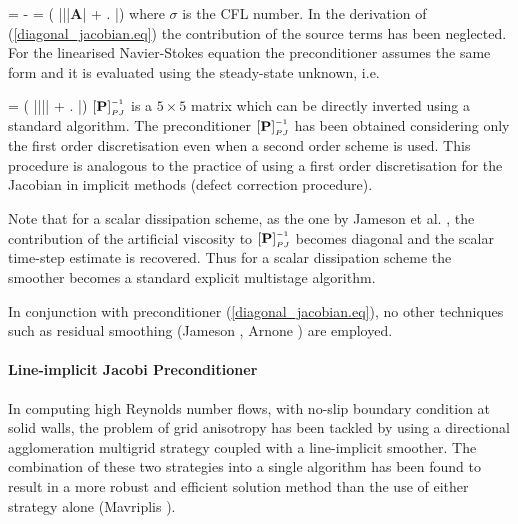 %
\beq
  \left[{\bf P}\right] =
  - 
  = 
   \sum{}
   \left( \left|\vec{\eta}\right|\left|{\bf A}\right|
   + \tau{} \left.
                {}\right|\sm{\mu}\right)
 \label{diagonal_jacobian.eq}
\eeq
%
 where $\sigma$ is the CFL number. In the derivation of (\ref{diagonal_jacobian.eq})
 the contribution of the source terms has been neglected.
 For the linearised Navier-Stokes
 equation the preconditioner assumes the same form and it is evaluated
 using the steady-state unknown, i.e.

%
\beq
   =
   \sum{}
   \left( \left|\vec{\eta}\right|\left|\right|
   + \tau{} \left.
                {\partial {}}\right|\sm{\overline{\mu}}\right)
 \label{diagonal_jacobian_lin.eq}
\eeq
%
 $\left[{\bf P}\right]_{\mbox{\tiny $PJ$}}^{\mbox{\tiny $-1$}}$ is a $5\times 5$ matrix which
 can be directly inverted using
 a standard algorithm.
 The preconditioner $\left[{\bf P}\right]_{\mbox{\tiny $PJ$}}^{\mbox{\tiny $-1$}}$ has been obtained considering
 only the first order discretisation even when a second order scheme is used.
 This procedure is analogous to the practice of using a first order
 discretisation for the Jacobian in implicit methods (defect correction procedure).

 Note that for a scalar dissipation scheme, as the one by Jameson et al. \citeyear{Jame:1},
 the contribution of the artificial viscosity to $\left[{\bf P}\right]_{\mbox{\tiny $PJ$}}^{\mbox{\tiny $-1$}}$ becomes
 diagonal and the scalar time-step estimate is recovered. Thus for
 a scalar dissipation scheme the smoother becomes a standard explicit multistage
 algorithm.

 In conjunction with preconditioner (\ref{diagonal_jacobian.eq}), no other
 techniques such as residual smoothing (Jameson ,
 Arnone ) are employed.
%
%
%
\paragraph{Line-implicit Jacobi Preconditioner}
%
 In computing high Reynolds number flows, with no-slip boundary condition
 at solid walls, the problem of grid anisotropy has been tackled by using
 a directional agglomeration multigrid strategy coupled with a line-implicit
 smoother.
 The combination of these two strategies into a single algorithm has been found to
 result in a more robust and efficient solution method than the use
 of either strategy alone (Mavriplis ).

